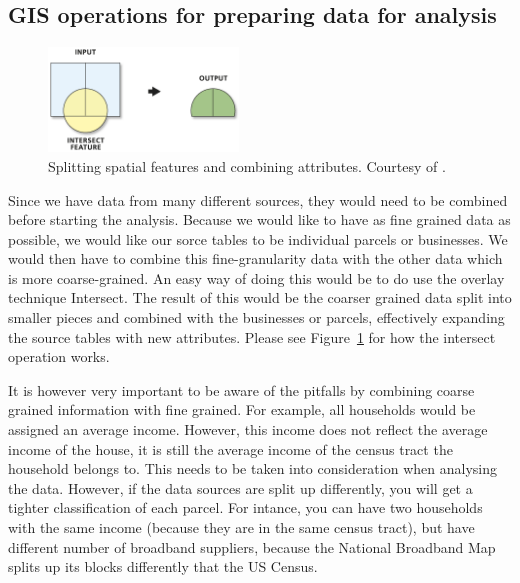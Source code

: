 \documentclass[twocolumn]{article}
\begin{document}
\subsection{GIS operations for preparing data for analysis}
\label{sub:GIS operations for combining data}
\begin{figure}
  \centering
  \includegraphics[width=0.45\textwidth]{img/intersect.png}
  \caption{Splitting spatial features and combining attributes. Courtesy of \cite{noauthor_undated-dw}.}
  \label{fig:intersect}
\end{figure}
Since we have data from many different sources, they would need to be combined before starting the analysis. Because we would like to have as fine grained data as possible, we would like our sorce tables to be individual parcels or businesses. We would then have to combine this fine-granularity data with the other data which is more coarse-grained. An easy way of doing this would be to do use the overlay technique Intersect. The result of this would be the coarser grained data split into smaller pieces and combined with the businesses or parcels, effectively expanding the source tables with new attributes. Please see Figure~\ref{fig:intersect} for how the intersect operation works.

It is however very important to be aware of the pitfalls by combining coarse grained information with fine grained. For example, all households would be assigned an average income. However, this income does not reflect the average income of the house, it is still the average income of the census tract the household belongs to. This needs to be taken into consideration when analysing the data. However, if the data sources are split up differently, you will get a tighter classification of each parcel. For intance, you can have two households with the same income (because they are in the same census tract), but have different number of broadband suppliers, because the National Broadband Map splits up its blocks differently that the US Census.
\end{document}
